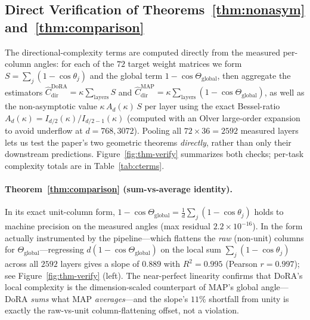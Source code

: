 \documentclass[11pt]{article}
\newcommand{\Thetaglob}{\Theta_{\mathrm{global}}}
\begin{document}
\subsection{Direct Verification of Theorems~\ref{thm:nonasym} and~\ref{thm:comparison}}
\label{sec:thm-verify}
The directional-complexity terms are computed directly from the measured per-column
angles: for each of the $72$ target weight matrices we form
$S=\sum_j(1-\cos\theta_j)$ and the global term $1-\cos\Thetaglob$, then aggregate the
estimators $\widehat{C}^{\mathrm{DoRA}}_{\mathrm{dir}}=\kappa\sum_{\text{layers}}S$
and $\widehat{C}^{\mathrm{MAP}}_{\mathrm{dir}}=\kappa\sum_{\text{layers}}(1-\cos\Thetaglob)$,
as well as the non-asymptotic value $\kappa\,A_{d}(\kappa)\,S$ per layer using the
exact Bessel-ratio $A_d(\kappa)=I_{d/2}(\kappa)/I_{d/2-1}(\kappa)$ (computed with an
Olver large-order expansion to avoid underflow at $d=768,3072$). Pooling all
$72\times36=2592$ measured layers lets us test the paper's two geometric theorems
\emph{directly}, rather than only their downstream predictions.
Figure~\ref{fig:thm-verify} summarizes both checks; per-task complexity totals are in
Table~\ref{tab:cterms}.

\paragraph{Theorem~\ref{thm:comparison} (sum-vs-average identity).}
In its exact unit-column form, $1-\cos\Thetaglob=\frac1d\sum_j(1-\cos\theta_j)$ holds
to machine precision on the measured angles (max residual $2.2\times10^{-16}$). In the
form actually instrumented by the pipeline---which flattens the \emph{raw} (non-unit)
columns for $\Thetaglob$---regressing $d(1-\cos\Thetaglob)$ on the local sum
$\sum_j(1-\cos\theta_j)$ across all $2592$ layers gives a slope of $0.889$ with
$R^2=0.995$ (Pearson $r=0.997$); see Figure~\ref{fig:thm-verify} (left). The
near-perfect linearity confirms that DoRA's local complexity is the dimension-scaled
counterpart of MAP's global angle---DoRA \emph{sums} what MAP \emph{averages}---and
the slope's $11\%$ shortfall from unity is exactly the raw-vs-unit column-flattening
offset, not a violation.
\end{document}
